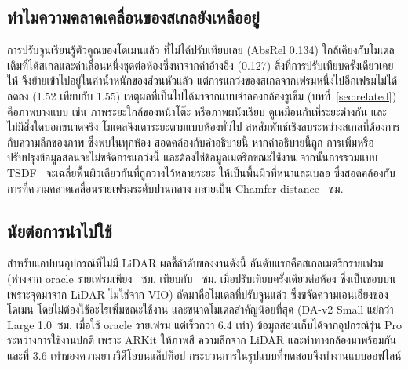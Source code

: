 \subsection{ทำไมความคลาดเคลื่อนของสเกลยังเหลืออยู่}\label{sec:whyft}
การปรับจูนเรียนรู้ตัวคูณของโดเมนแล้ว \ftmain{} ที่ไม่ได้ปรับเทียบเลย (AbsRel 0.134)
ใกล้เคียงกับโมเดลเดิมที่ได้สเกลและค่าเลื่อนหนึ่งชุดต่อห้องซึ่งหาจากค่าอ้างอิง (0.127)
สิ่งที่การปรับเทียบครั้งเดียวเคยให้ จึงย้ายเข้าไปอยู่ในค่าน้ำหนักของส่วนหัวแล้ว
แต่การแกว่งของสเกลจากเฟรมหนึ่งไปอีกเฟรมไม่ได้ลดลง (1.52 เทียบกับ 1.55)
เหตุผลที่เป็นไปได้มาจากแบบจำลองกล้องรูเข็ม (บทที่~\ref{sec:related}) คือภาพบางแบบ
เช่น ภาพระยะใกล้ของหน้าโต๊ะ หรือภาพผนังเรียบ ดูเหมือนกันที่ระยะต่างกัน และไม่มีสิ่งใดบอกขนาดจริง
โมเดลจึงเดาระยะตามแบบห้องทั่วไป สหสัมพันธ์เชิงลบระหว่างสเกลที่ต้องการกับความลึกของภาพ ซึ่งพบในทุกห้อง สอดคล้องกับคำอธิบายนี้
หากคำอธิบายนี้ถูก การเพิ่มหรือปรับปรุงข้อมูลสอนจะไม่ขจัดการแกว่งนี้ และต้องใช้ข้อมูลเมตริกขณะใช้งาน
จากนั้นการรวมแบบ TSDF~\cite{curless96} จะเฉลี่ยพื้นผิวเดียวกันที่ถูกวางไว้หลายระยะ ให้เป็นพื้นผิวที่หนาและเบลอ
ซึ่งสอดคล้องกับการที่ความคลาดเคลื่อนรายเฟรมระดับปานกลาง กลายเป็น Chamfer distance \rsFTLIDARALLCM{}~ซม.

\subsection{นัยต่อการนำไปใช้}\label{sec:business}
สำหรับแอปบนอุปกรณ์ที่ไม่มี LiDAR ผลชี้ลำดับของงานดังนี้ อันดับแรกคือสเกลเมตริกรายเฟรม
(ห่างจาก oracle รายเฟรมเพียง \rsSPARSEGAP{}~ซม. เทียบกับ \rsSCENECM{}~ซม. เมื่อปรับเทียบครั้งเดียวต่อห้อง
ซึ่งเป็นขอบบน เพราะจุดมาจาก LiDAR ไม่ใช่จาก VIO) ถัดมาคือโมเดลที่ปรับจูนแล้ว ซึ่งขจัดความเอนเอียงของโดเมน
โดยไม่ต้องใช้อะไรเพิ่มขณะใช้งาน และขนาดโมเดลสำคัญน้อยที่สุด (\mbox{DA-v2} Small แย่กว่า Large 1.0~ซม.
เมื่อใช้ oracle รายเฟรม แต่เร็วกว่า 6.4 เท่า) ข้อมูลสอนเก็บได้จากอุปกรณ์รุ่น Pro ระหว่างการใช้งานปกติ
เพราะ ARKit ให้ภาพสี ความลึกจาก LiDAR และท่าทางกล้องมาพร้อมกัน และที่ 3.6 เท่าของความยาววิดีโอบนแล็ปท็อป
กระบวนการในรูปแบบที่ทดสอบจึงทำงานแบบออฟไลน์

